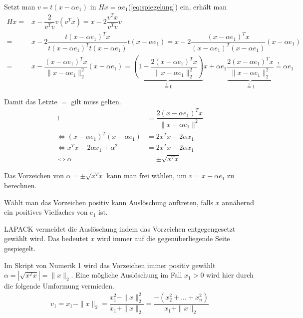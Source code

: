 Setzt man $v = t(x - \alpha e_1)$ in $Hx = \alpha e_1 $(\ref{eq:spiegelung}) ein, erhält man 
\begin{align*}
	Hx =& x - \dfrac{2}{v^Tv}v(v^Tx) = x - 2\dfrac{v^Tx}{v^Tv}v\\
	=& x - 2\dfrac{ t(x - \alpha e_1)^Tx}{ t(x - \alpha e_1)^T t(x - \alpha e_1)} t(x - \alpha e_1)
	= x - 2\dfrac{ (x - \alpha e_1)^Tx}{ (x - \alpha e_1)^T (x - \alpha e_1)} (x - \alpha e_1)
	\\
	=& x - \dfrac{(x - \alpha e_1)^Tx}{\|x - \alpha e_1\|_2^2} (x - \alpha e_1)
	=\underbrace{\left(1 - \dfrac{2(x - \alpha e_1)^Tx}{\|x - \alpha e_1\|_2^2}\right)}_{ \overset{!}{=} 0 } x + \alpha e_1 \underbrace{\dfrac{2(x - \alpha e_1)^Tx}{\|x - \alpha e_1\|_2^2} }_{\overset{!}{=} 1} \overset{!}{=} \alpha e_1
\end{align*}

Damit das Letzte $=$ gilt muss gelten.
\begin{align*}
	1 &= \dfrac{2(x - \alpha e_1)^Tx}{\|x - \alpha e_1\|^2}\\
	\Leftrightarrow (x - \alpha e_1)^T(x - \alpha e_1) &= 2 x^T x - 2\alpha x_1 \\
	\Leftrightarrow x^Tx -2\alpha x_1 + \alpha^2 &= 2 x^T x - 2\alpha x_1\\
	\Leftrightarrow \alpha &= \pm \sqrt{x^Tx}
\end{align*}

Das Vorzeichen von  $\alpha = \pm \sqrt{x^Tx}$ kann man frei wählen, um $ v = x - \alpha e_1$ zu berechnen.

Wählt man das Vorzeichen positiv kann Auslöschung auftreten, falls $x$ annähernd ein positives Vielfaches von $e_1$ ist.

LAPACK \cite{DGEQR2} vermeidet die Auslöschung indem das Vorzeichen entgegengesetzt gewählt wird. Das bedeutet $x$ wird immer auf die gegenüberliegende Seite gespiegelt.

Im Skript von Numerik 1 \cite{num1} wird das Vorzeichen immer positiv gewählt\\ $\alpha = |\sqrt{x^Tx}| = \|x\|_2$. Eine mögliche Auslöschung im Fall $ x_1 > 0$ wird hier durch die folgende Umformung vermieden.
\begin{align*}
	v_1 = x_1 - \|x\|_2 = \dfrac{x_1^2 - \|x\|_2^2}{x_1 + \|x\|_2}
	=\dfrac{-(x_2^2+...+x_n^2)}{x_1 + \|x\|_2}
\end{align*}


